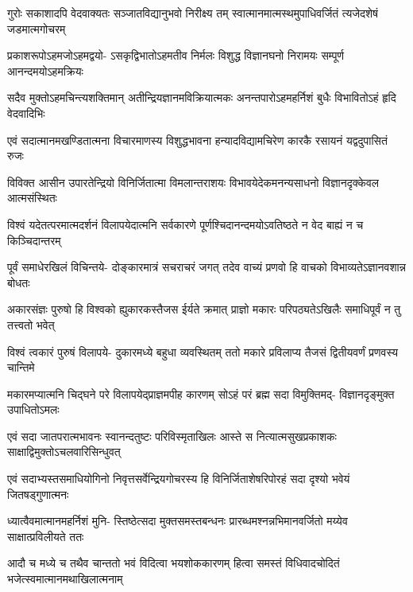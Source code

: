 \fourlineindentedshloka
{गुरोः सकाशादपि वेदवाक्यतः}
{सञ्जातविद्यानुभवो निरीक्ष्य तम्}
{स्वात्मानमात्मस्थमुपाधिवर्जितं}
{त्यजेदशेषं जडमात्मगोचरम्} %

\fourlineindentedshloka
{प्रकाशरूपोऽहमजोऽहमद्वयो-}
{ऽसकृद्विभातोऽहमतीव निर्मलः}
{विशुद्ध विज्ञानघनो निरामयः}
{सम्पूर्ण आनन्दमयोऽहमक्रियः} %

\fourlineindentedshloka
{सदैव मुक्तोऽहमचिन्त्यशक्तिमान्}
{अतीन्द्रियज्ञानमविक्रियात्मकः}
{अनन्तपारोऽहमहर्निशं बुधैः}
{विभावितोऽहं हृदि वेदवादिभिः} %

\fourlineindentedshloka
{एवं सदात्मानमखण्डितात्मना}
{विचारमाणस्य विशुद्धभावना}
{हन्यादविद्यामचिरेण कारकै}
{रसायनं यद्वदुपासितं रुजः} %

\fourlineindentedshloka
{विविक्त आसीन उपारतेन्द्रियो}
{विनिर्जितात्मा विमलान्तराशयः}
{विभावयेदेकमनन्यसाधनो}
{विज्ञानदृक्केवल आत्मसंस्थितः} %

\fourlineindentedshloka
{विश्वं यदेतत्परमात्मदर्शनं}
{विलापयेदात्मनि सर्वकारणे}
{पूर्णश्चिदानन्दमयोऽवतिष्ठते}
{न वेद बाह्यं न च किञ्चिदान्तरम्} %

\fourlineindentedshloka
{पूर्वं समाधेरखिलं विचिन्तये-}
{दोङ्कारमात्रं सचराचरं जगत्}
{तदेव वाच्यं प्रणवो हि वाचको}
{विभाव्यतेऽज्ञानवशान्न बोधतः} %

\fourlineindentedshloka
{अकारसंज्ञः पुरुषो हि विश्वको}
{ह्युकारकस्तैजस ईर्यते क्रमात्}
{प्राज्ञो मकारः परिपठ्यतेऽखिलैः}
{समाधिपूर्वं न तु तत्त्वतो भवेत्} %

\fourlineindentedshloka
{विश्वं त्वकारं पुरुषं विलापये-}
{दुकारमध्ये बहुधा व्यवस्थितम्}
{ततो मकारे प्रविलाप्य तैजसं}
{द्वितीयवर्णं प्रणवस्य चान्तिमे} %

\fourlineindentedshloka
{मकारमप्यात्मनि चिद्घने परे}
{विलापयेद्प्राज्ञमपीह कारणम्}
{सोऽहं परं ब्रह्म सदा विमुक्तिमद्-}
{विज्ञानदृङ्मुक्त उपाधितोऽमलः} %

\fourlineindentedshloka
{एवं सदा जातपरात्मभावनः}
{स्वानन्दतुष्टः परिविस्मृताखिलः}
{आस्ते स नित्यात्मसुखप्रकाशकः}
{साक्षाद्विमुक्तोऽचलवारिसिन्धुवत्} %

\fourlineindentedshloka
{एवं सदाभ्यस्तसमाधियोगिनो}
{निवृत्तसर्वेन्द्रियगोचरस्य हि}
{विनिर्जिताशेषरिपोरहं सदा}
{दृश्यो भवेयं जितषड्गुणात्मनः} %

\fourlineindentedshloka
{ध्यात्वैवमात्मानमहर्निशं मुनि-}
{स्तिष्ठेत्सदा मुक्तसमस्तबन्धनः}
{प्रारब्धमश्नन्नभिमानवर्जितो}
{मय्येव साक्षात्प्रविलीयते ततः} %

\fourlineindentedshloka
{आदौ च मध्ये च तथैव चान्ततो}
{भवं विदित्वा भयशोककारणम्}
{हित्वा समस्तं विधिवादचोदितं}
{भजेत्स्वमात्मानमथाखिलात्मनाम्} %

